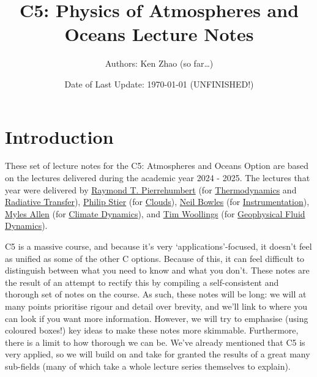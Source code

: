 \documentclass[a4paper,11pt,twoside]{report}
\title{C5: Physics of Atmospheres and Oceans Lecture Notes}
\author{Authors: Ken Zhao (so far\dots)}
\date{Date of Last Update: \today \hspace{2mm} (UNFINISHED!)}
\begin{document}
\begin{titlingpage}
\maketitle
\end{titlingpage}

\tableofcontents

\newpage

\begin{sloppypar}

\section*{Introduction}

These set of lecture notes for the C5: Atmospheres and Oceans Option are based on the lectures delivered during the academic year 2024 - 2025. The lectures that year were delivered by 
\href{https://users.physics.ox.ac.uk/~pierrehumbert/}{Raymond T. Pierrehumbert} 
(for \hyperref[Thermodynamics]{Thermodynamics} and \hyperref[Radiative Transfer]{Radiative Transfer}), 
\href{https://www.physics.ox.ac.uk/our-people/stier}{Philip Stier} 
(for \hyperref[Clouds]{Clouds}), 
\href{https://www.physics.ox.ac.uk/our-people/bowles}{Neil Bowles} 
(for \hyperref[Instrumentation]{Instrumentation}), 
\href{https://www.physics.ox.ac.uk/our-people/allenm}{Myles Allen} 
(for \hyperlink{Climate Dynamics}{Climate Dynamics}), and \href{https://www.physics.ox.ac.uk/our-people/woollings}{Tim Woollings} 
(for \hyperref[Geophysical Fluid Dynamics]{Geophysical Fluid Dynamics}).

C5 is a massive course, and because it's very `applications'-focused, it doesn't feel as unified as some of the other C options. Because of this, it can feel difficult to distinguish between what you need to know and what you don't. These notes are the result of an attempt to rectify this by compiling a self-consistent and thorough set of notes on the course. As such, these notes will be long: we will at many points prioritise rigour and detail over brevity, and we'll link to where you can look if you want more information. However, we will try to emphasise (using coloured boxes!) key ideas to make these notes more skimmable. Furthermore, there is a limit to how thorough we can be. We've already mentioned that C5 is very applied, so we will build on and take for granted the results of a great many sub-fields (many of which take a whole lecture series themselves to explain).


\end{sloppypar}
\end{document}
